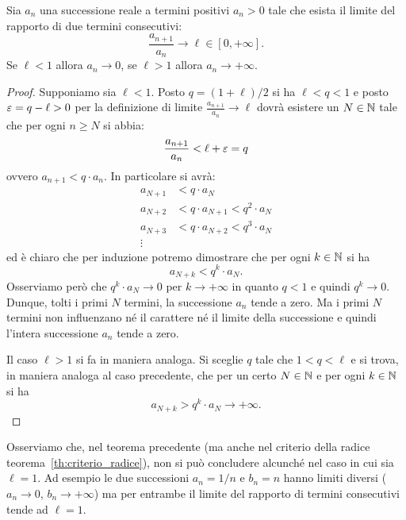 \begin{theorem}
\label{th:criterio_rapporto}
  Sia $a_n$ una successione reale a termini positivi
  $a_n > 0$ tale che esista il limite del rapporto di due termini consecutivi:
  \[
     \frac{a_{n+1}}{a_n} \to \ell \in [0,+\infty].
  \]
  Se $\ell < 1$ allora $a_n \to 0$, se $\ell >1$ allora $a_n \to +\infty$.
\end{theorem}
%
%
%

\begin{proof}
Supponiamo sia $\ell<1$. Posto $q=(1+\ell)/2$ si ha $\ell < q < 1$ 
e posto $\varepsilon=q-\ell>0$ per la definizione di limite $\frac{a_{n+1}}{a_n}\to \ell$ 
dovrà esistere un $N\in {\mathbb N}$ tale
che per ogni $n\ge N$ si abbia:
\[
  \frac{a_{n+1}}{a_n} < \ell + \varepsilon = q
\]
ovvero $a_{n+1} < q \cdot a_n$. In particolare si avrà:
\begin{align*}
  a_{N+1} &< q \cdot a_N \\
  a_{N+2} &< q \cdot a_{N+1} < q^2\cdot a_N \\
  a_{N+3} &< q \cdot a_{N+2} < q^3\cdot a_N \\
  \vdots
\end{align*}
ed è chiaro che per induzione potremo dimostrare che per
ogni $k\in {\mathbb N}$ si ha
\[
  a_{N+k} < q^k\cdot a_N.
\]
Osserviamo però che $q^k \cdot a_N \to 0$ per $k\to +\infty$
in quanto $q<1$ e quindi $q^k \to 0$. 
Dunque, tolti i primi $N$ termini, la successione $a_n$ tende a zero. 
Ma i primi $N$ termini non influenzano né il carattere né il limite 
della successione e quindi l'intera successione $a_n$ tende a zero.

Il caso $\ell>1$ si fa in maniera analoga. Si sceglie $q$ tale
che $1<q<\ell$ e si trova, in maniera analoga al caso precedente,
che per un certo $N\in {\mathbb N}$ e per ogni $k\in {\mathbb N}$ si ha
\[
  a_{N+k} > q^k \cdot a_N \to +\infty.
\]
\end{proof}

Osserviamo che, nel teorema precedente (ma anche nel criterio della radice teorema~\ref{th:criterio_radice}),
non si può concludere alcunché nel
caso in cui sia $\ell = 1$.
Ad esempio le due successioni $a_n = 1/n$ e $b_n = n$
hanno limiti diversi ($a_n \to 0$, $b_n\to +\infty$) ma per entrambe
il limite del rapporto di termini consecutivi tende ad $\ell=1$.

